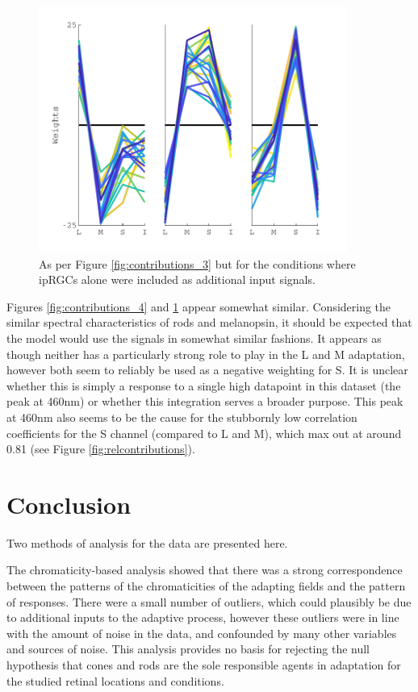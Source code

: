 \begin{figure}[htbp]
\includegraphics[max width=0.9\textwidth]{figs/LargeSphere/contributions_5minusrods.pdf}
\caption{As per Figure \ref{fig:contributions_3} but for the conditions where ipRGCs alone were included as additional input signals.} 
\label{fig:contributions_5minusrods}
\end{figure}

Figures \ref{fig:contributions_4} and \ref{fig:contributions_5minusrods} appear somewhat similar. Considering the similar spectral characteristics of rods and melanopsin, it should be expected that the model would use the signals in somewhat similar fashions. It appears as though neither has a particularly strong role to play in the L and M adaptation, however both seem to reliably be used as a negative weighting for S. It is unclear whether this is simply a response to a single high datapoint in this dataset (the peak at 460nm) or whether this integration serves a broader purpose. This peak at 460nm also seems to be the cause for the stubbornly low correlation coefficients for the S channel (compared to L and M), which max out at around 0.81 (see Figure \ref{fig:relcontributions}).

\section{Conclusion}
\label{sec:LSdis}

Two methods of analysis for the \citet{macdonald_chromatic_2013} data are presented here.

The chromaticity-based analysis showed that there was a strong correspondence between the patterns of the chromaticities of the adapting fields and the pattern of responses. There were a small number of outliers, which could plausibly be due to additional inputs to the adaptive process, however these outliers were in line with the amount of noise in the data, and confounded by many other variables and sources of noise. This analysis provides no basis for rejecting the null hypothesis that cones and rods are the sole responsible agents in adaptation for the studied retinal locations and conditions.

